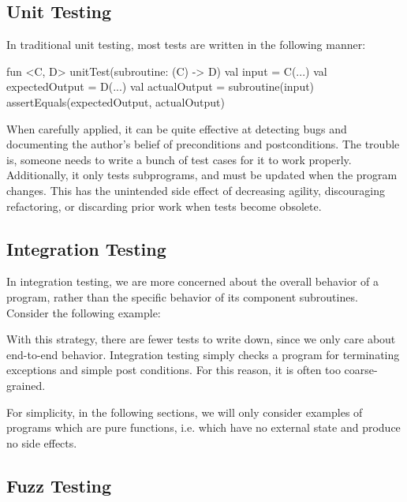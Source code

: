 \documentclass[12pt,initial,twoside,maitrise]{dms}
\numberwithin{equation}{section}
\numberwithin{table}{chapter}
\numberwithin{figure}{chapter}
\begin{document}
\subsection{Unit Testing}

\noindent In traditional unit testing, most tests are written in the following manner:
%
\begin{kotlinlisting}
fun <C, D> unitTest(subroutine: (C) -> D) {
    val input = C(...)
    val expectedOutput = D(...)
    val actualOutput = subroutine(input)
    assertEquals(expectedOutput, actualOutput)
}
\end{kotlinlisting}
%
When carefully applied, it can be quite effective at detecting bugs and documenting the author's belief of preconditions and postconditions. The trouble is, someone needs to write a bunch of test cases for it to work properly. Additionally, it only tests subprograms, and must be updated when the program changes. This has the unintended side effect of decreasing agility, discouraging refactoring, or discarding prior work when tests become obsolete.

\subsection{Integration Testing}

\noindent In integration testing, we are more concerned about the overall behavior of a program, rather than the specific behavior of its component subroutines. Consider the following example:

%
With this strategy, there are fewer tests to write down, since we only care about end-to-end behavior. Integration testing simply checks a program for terminating exceptions and simple post conditions. For this reason, it is often too coarse-grained.

For simplicity, in the following sections, we will only consider examples of programs which are pure functions, i.e. which have no external state and produce no side effects.

\subsection{Fuzz Testing}
\end{document}
